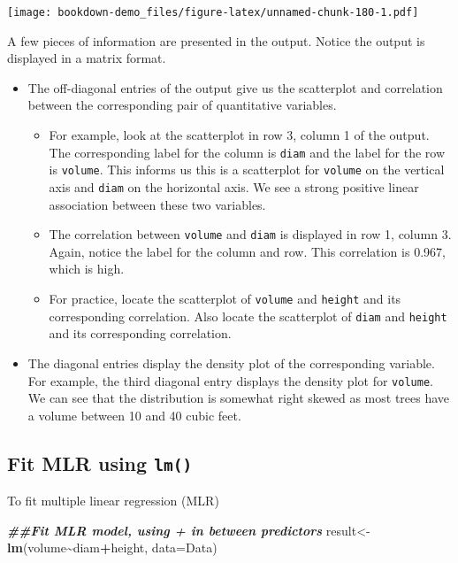 \documentclass[
]{book}
\newenvironment{Shaded}{\begin{snugshade}}{\end{snugshade}}
\newcommand{\AttributeTok}[1]{\textcolor[rgb]{0.13,0.29,0.53}{#1}}
\newcommand{\DocumentationTok}[1]{\textcolor[rgb]{0.56,0.35,0.01}{\textbf{\textit{#1}}}}
\newcommand{\FunctionTok}[1]{\textcolor[rgb]{0.13,0.29,0.53}{\textbf{#1}}}
\newcommand{\NormalTok}[1]{#1}
\newcommand{\OtherTok}[1]{\textcolor[rgb]{0.56,0.35,0.01}{#1}}
\newcommand{\SpecialCharTok}[1]{\textcolor[rgb]{0.81,0.36,0.00}{\textbf{#1}}}
\providecommand{\tightlist}{%
  \setlength{\itemsep}{0pt}\setlength{\parskip}{0pt}}
\begin{document}
\texttt{[image: bookdown-demo\_files/figure-latex/unnamed-chunk-180-1.pdf]}

A few pieces of information are presented in the output. Notice the output is displayed in a matrix format.

\begin{itemize}
\tightlist
\item
  The off-diagonal entries of the output give us the scatterplot and correlation between the corresponding pair of quantitative variables.

  \begin{itemize}
  \tightlist
  \item
    For example, look at the scatterplot in row 3, column 1 of the output. The corresponding label for the column is \texttt{diam} and the label for the row is \texttt{volume}. This informs us this is a scatterplot for \texttt{volume} on the vertical axis and \texttt{diam} on the horizontal axis. We see a strong positive linear association between these two variables.
  \item
    The correlation between \texttt{volume} and \texttt{diam} is displayed in row 1, column 3. Again, notice the label for the column and row. This correlation is 0.967, which is high.
  \item
    For practice, locate the scatterplot of \texttt{volume} and \texttt{height} and its corresponding correlation. Also locate the scatterplot of \texttt{diam} and \texttt{height} and its corresponding correlation.
  \end{itemize}
\item
  The diagonal entries display the density plot of the corresponding variable. For example, the third diagonal entry displays the density plot for \texttt{volume}. We can see that the distribution is somewhat right skewed as most trees have a volume between 10 and 40 cubic feet.
\end{itemize}

\hypertarget{fit-mlr-using-lm}{%
\subsection*{\texorpdfstring{Fit MLR using \texttt{lm()}}{Fit MLR using lm()}}\label{fit-mlr-using-lm}}

To fit multiple linear regression (MLR)

\begin{Shaded}
\begin{Highlighting}[]
\DocumentationTok{\#\#Fit MLR model, using + in between predictors}
\NormalTok{result}\OtherTok{\textless{}{-}}\FunctionTok{lm}\NormalTok{(volume}\SpecialCharTok{\textasciitilde{}}\NormalTok{diam}\SpecialCharTok{+}\NormalTok{height, }\AttributeTok{data=}\NormalTok{Data)}
\end{Highlighting}
\end{Shaded}
\end{document}
